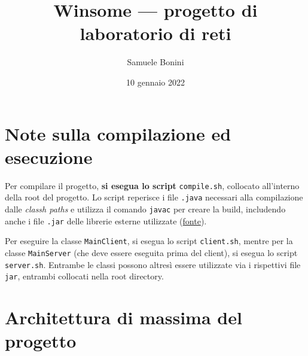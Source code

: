 \documentclass[a4paper,8pt]{article} %
\title{Winsome --- progetto di laboratorio di reti} %
\author{Samuele Bonini}
\date{10 gennaio 2022}
\def\code#1{\texttt{#1}}
\begin{document}
\maketitle %



\tableofcontents %
\setlength{\parskip}{0.5em}

\section{Note sulla compilazione ed esecuzione}
Per compilare il progetto, \textbf{si esegua lo script} \code{compile.sh}, collocato all'interno della root del progetto.
Lo script reperisce i file \code{.java}  necessari alla compilazione dalle \emph{classh paths} e utilizza il comando \code{javac} per creare la build,
includendo anche i file \code{.jar} delle librerie esterne utilizzate (\href{https://twin.sh/articles/8/how-to-compile-large-java-projects-from-terminal}{fonte}).

\par Per eseguire la classe \code{MainClient}, si esegua lo script \code{client.sh}, mentre per la classe \code{MainServer} (che deve essere
eseguita prima del client), si esegua lo script \code{server.sh}. Entrambe le classi possono altresì essere utilizzate via i rispettivi file \code{jar}, entrambi collocati nella root directory.

\section{Architettura di massima del progetto} %
\end{document}
